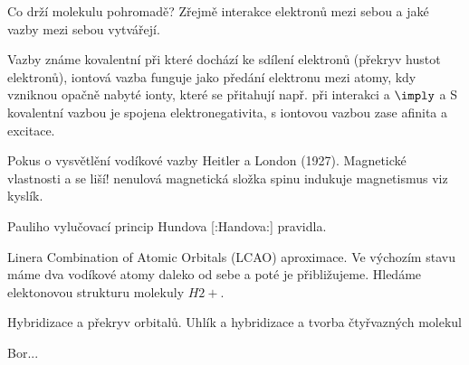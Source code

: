 Co drží molekulu pohromadě? Zřejmě interakce elektronů mezi sebou a jaké vazby mezi sebou vytvářejí.

Vazby známe kovalentní při které dochází ke sdílení elektronů (překryv hustot elektronů), iontová vazba funguje jako předání elektronu mezi atomy, kdy vzniknou opačně nabyté ionty, které se přitahují např. při interakci  a  $\imply$  a 
S kovalentní vazbou je spojena elektronegativita, s iontovou vazbou zase afinita a excitace. 

Pokus o vysvětlění vodíkové vazby Heitler a London (1927).
Magnetické vlastnosti  a  se liší! nenulová magnetická složka spinu indukuje magnetismus viz kyslík.

Pauliho vylučovací princip  Hundova [:Handova:] pravidla.

Linera Combination of Atomic Orbitals (LCAO) aproximace. Ve výchozím stavu máme dva vodíkové atomy daleko od sebe a poté je přibližujeme.
Hledáme elektonovou strukturu molekuly $H2+$.


Hybridizace a překryv orbitalů. Uhlík a hybridizace a tvorba čtyřvazných molekul

Bor...